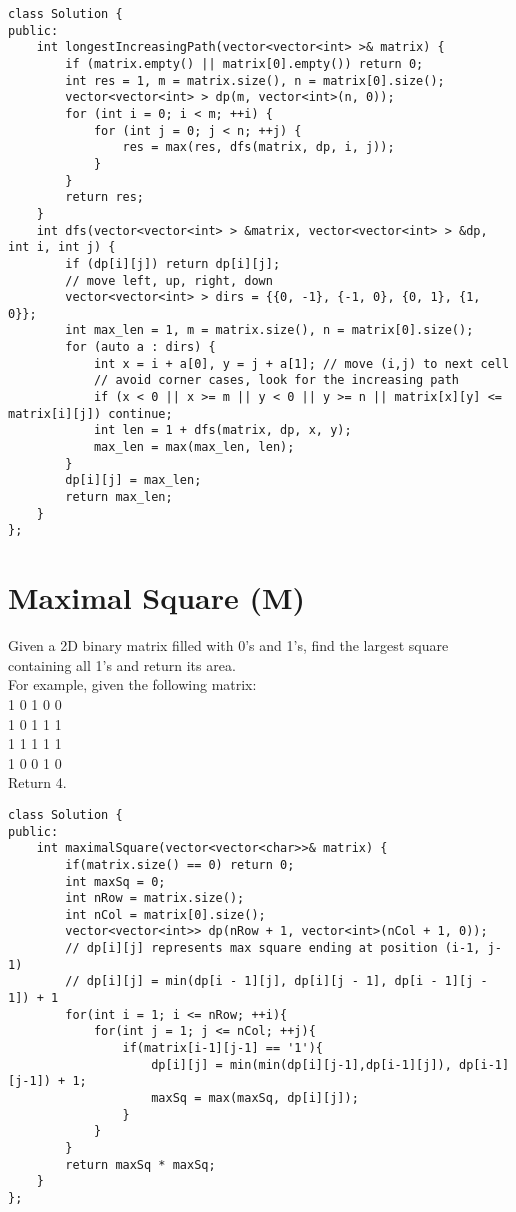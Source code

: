 \begin{lstlisting}
class Solution {
public:
    int longestIncreasingPath(vector<vector<int> >& matrix) {
        if (matrix.empty() || matrix[0].empty()) return 0;
        int res = 1, m = matrix.size(), n = matrix[0].size();
        vector<vector<int> > dp(m, vector<int>(n, 0));
        for (int i = 0; i < m; ++i) {
            for (int j = 0; j < n; ++j) {
                res = max(res, dfs(matrix, dp, i, j));
            }
        }
        return res;
    }
    int dfs(vector<vector<int> > &matrix, vector<vector<int> > &dp, int i, int j) {
        if (dp[i][j]) return dp[i][j];
        // move left, up, right, down
        vector<vector<int> > dirs = {{0, -1}, {-1, 0}, {0, 1}, {1, 0}}; 
        int max_len = 1, m = matrix.size(), n = matrix[0].size();
        for (auto a : dirs) {
            int x = i + a[0], y = j + a[1]; // move (i,j) to next cell
            // avoid corner cases, look for the increasing path
            if (x < 0 || x >= m || y < 0 || y >= n || matrix[x][y] <= matrix[i][j]) continue;
            int len = 1 + dfs(matrix, dp, x, y);
            max_len = max(max_len, len);
        }
        dp[i][j] = max_len;
        return max_len;
    }
};
\end{lstlisting}


\section{Maximal Square (M)}
Given a 2D binary matrix filled with 0's and 1's, find the largest square containing all 1's and return its area.\\

For example, given the following matrix:\\
1 0 1 0 0\\
1 0 1 1 1\\
1 1 1 1 1\\
1 0 0 1 0\\
Return 4.\\

\begin{lstlisting}
class Solution {
public:
    int maximalSquare(vector<vector<char>>& matrix) {
        if(matrix.size() == 0) return 0;
        int maxSq = 0;
        int nRow = matrix.size();
        int nCol = matrix[0].size();
        vector<vector<int>> dp(nRow + 1, vector<int>(nCol + 1, 0));
        // dp[i][j] represents max square ending at position (i-1, j-1)
        // dp[i][j] = min(dp[i - 1][j], dp[i][j - 1], dp[i - 1][j - 1]) + 1
        for(int i = 1; i <= nRow; ++i){
            for(int j = 1; j <= nCol; ++j){
                if(matrix[i-1][j-1] == '1'){
                    dp[i][j] = min(min(dp[i][j-1],dp[i-1][j]), dp[i-1][j-1]) + 1;
                    maxSq = max(maxSq, dp[i][j]);
                }   
            }
        }
        return maxSq * maxSq;      
    }
};
\end{lstlisting}


